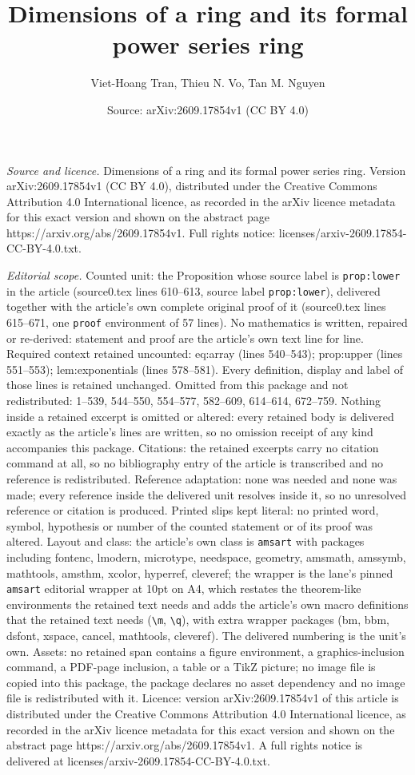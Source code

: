 \documentclass[10pt,a4paper]{amsart}
\title[Dimensions of a ring and its formal power series ring]{Dimensions of a ring and its formal power series ring}
\author{Viet-Hoang Tran, Thieu N. Vo, Tan M. Nguyen}
\date{Source: arXiv:2609.17854v1 (CC BY 4.0)}
\begin{document}
\maketitle

\noindent\emph{Source and licence.} Dimensions of a ring and its formal power series ring. Version arXiv:2609.17854v1 (CC BY 4.0), distributed under the Creative Commons Attribution 4.0 International licence, as recorded in the arXiv licence metadata for this exact version and shown on the abstract page https://arxiv.org/abs/2609.17854v1. Full rights notice: licenses/arxiv-2609.17854-CC-BY-4.0.txt.\par\smallskip

\noindent\textit{Editorial scope.} Counted unit: the Proposition whose source label is \texttt{prop:lower} in the article (source0.tex lines 610--613, source label \texttt{prop:lower}), delivered together with the article's own complete original proof of it (source0.tex lines 615--671, one \texttt{proof} environment of 57 lines). No mathematics is written, repaired or re-derived: statement and proof are the article's own text line for line. Required context retained uncounted: eq:array (lines 540--543); prop:upper (lines 551--553); lem:exponentials (lines 578--581). Every definition, display and label of those lines is retained unchanged. Omitted from this package and not redistributed: 1--539, 544--550, 554--577, 582--609, 614--614, 672--759. Nothing inside a retained excerpt is omitted or altered: every retained body is delivered exactly as the article's lines are written, so no omission receipt of any kind accompanies this package. Citations: the retained excerpts carry no citation command at all, so no bibliography entry of the article is transcribed and no reference is redistributed. Reference adaptation: none was needed and none was made; every reference inside the delivered unit resolves inside it, so no unresolved reference or citation is produced. Printed slips kept literal: no printed word, symbol, hypothesis or number of the counted statement or of its proof was altered. Layout and class: the article's own class is \texttt{amsart} with packages including fontenc, lmodern, microtype, needspace, geometry, amsmath, amssymb, mathtools, amsthm, xcolor, hyperref, cleveref; the wrapper is the lane's pinned \texttt{amsart} editorial wrapper at 10pt on A4, which restates the theorem-like environments the retained text needs and adds the article's own macro definitions that the retained text needs (\texttt{\textbackslash m}, \texttt{\textbackslash q}), with extra wrapper packages (bm, bbm, dsfont, xspace, cancel, mathtools, cleveref). The delivered numbering is the unit's own. Assets: no retained span contains a figure environment, a graphics-inclusion command, a PDF-page inclusion, a table or a TikZ picture; no image file is copied into this package, the package declares no asset dependency and no image file is redistributed with it. Licence: version arXiv:2609.17854v1 of this article is distributed under the Creative Commons Attribution 4.0 International licence, as recorded in the arXiv licence metadata for this exact version and shown on the abstract page https://arxiv.org/abs/2609.17854v1. A full rights notice is delivered at licenses/arxiv-2609.17854-CC-BY-4.0.txt. 
\end{document}
